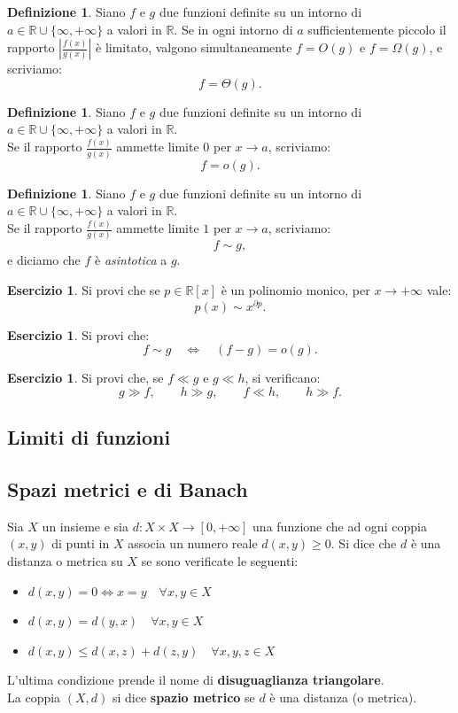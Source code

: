 \documentclass[a4paper,twoside]{article}
\newcommand{\R}{\mathbb{R}}
\theoremstyle{definition}
\newtheorem{definizione}[theorem]{Definizione}
\newtheorem{ex}[theorem]{Esercizio}
\numberwithin{theorem}{section}
\begin{document}
\begin{definizione}
Siano $f$ e $g$ due funzioni definite su un intorno di $a\in\R\cup\{\infty,+\infty\}$ a valori in $\R$. Se in ogni intorno di $a$ sufficientemente piccolo il rapporto $\left|\frac{f(x)}{g(x)}\right|$ è limitato, 
valgono simultaneamente $f=O(g)$ e $f=\Omega(g)$, e scriviamo:
$$ f = \Theta(g). $$
\end{definizione}

\begin{definizione}
Siano $f$ e $g$ due funzioni definite su un intorno di $a\in\R\cup\{\infty,+\infty\}$ a valori in $\R$.\\ Se il rapporto $\frac{f(x)}{g(x)}$ ammette limite $0$ per $x\to a$, scriviamo:
$$ f = o(g).$$ 
\end{definizione}

\begin{definizione}
Siano $f$ e $g$ due funzioni definite su un intorno di $a\in\R\cup\{\infty,+\infty\}$ a valori in $\R$.\\ Se il rapporto $\frac{f(x)}{g(x)}$ ammette limite $1$ per $x\to a$, scriviamo:
$$ f \sim g,$$
e diciamo che $f$ è \emph{asintotica} a $g$. 
\end{definizione}

\begin{framed}
\begin{ex}
Si provi che se $p\in\R[x]$ è un polinomio monico, per $x\to +\infty$ vale:
$$ p(x) \sim x^{\partial p}. $$
\end{ex}
\begin{ex}
Si provi che:
$$ f\sim g\quad\Longleftrightarrow\quad (f-g)=o(g). $$
\end{ex}
\begin{ex}
Si provi che, se $f\ll g$ e $g\ll h$, si verificano:
$$ g\gg f,\qquad h\gg g,\qquad f\ll h,\qquad h\gg f.$$
\end{ex}

\end{framed}

\subsection{Limiti di funzioni}

\subsection{Spazi metrici e di Banach}
Sia $X$ un insieme e sia $d:X \times X\to [0,+\infty]$ una funzione che ad ogni coppia $(x,y)$ di punti in $X$ associa un numero reale $d(x,y)\geq0$. Si dice che $d$ è una distanza o metrica su $X$ se sono verificate le seguenti:
\begin{itemize}
\item  $d(x,y)=0 \Leftrightarrow x=y\quad\forall x,y\in X$
\item $d(x,y)=d(y,x)\quad\forall x,y\in X$
\item $d(x,y)\leq d(x,z)+d(z,y)\quad\forall x,y,z\in X$
\end{itemize}
L'ultima condizione prende il nome di \textbf{disuguaglianza triangolare}.\\
La coppia $(X,d)$ si dice \textbf{spazio metrico} se $d$ è una distanza (o metrica).
\end{document}
